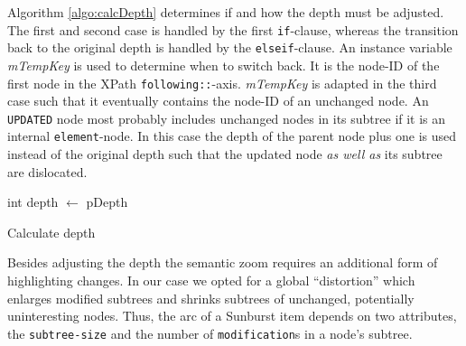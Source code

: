 Algorithm \ref{algo:calcDepth} determines if and how the depth must be adjusted. The first and second case is handled by the first \texttt{if}-clause, whereas the transition back to the original depth is handled by the \texttt{elseif}-clause. An instance variable \emph{mTempKey} is used to determine when to switch back. It is the node-ID of the first node in the XPath \texttt{following::}-axis. \emph{mTempKey} is adapted in the third case such that it eventually contains the node-ID of an unchanged node. An \texttt{UPDATED} node most probably includes unchanged nodes in its subtree if it is an internal \texttt{element}-node. In this case the depth of the parent node plus one is used instead of the original depth such that the updated node \emph{as well as} its subtree are dislocated.

\begin{algorithm}[tb]
{}
\BlankLine
int depth $\leftarrow$ pDepth\;
\caption{Calculate depth}\label{algo:calcDepth}
\end{algorithm}

Besides adjusting the depth the semantic zoom requires an additional form of highlighting changes. In our case we opted for a global ``distortion'' which enlarges modified subtrees and shrinks subtrees of unchanged, potentially uninteresting nodes. Thus, the arc of a Sunburst item depends on two attributes, the \texttt{subtree-size} and the number of \texttt{modification}s in a node's subtree.

